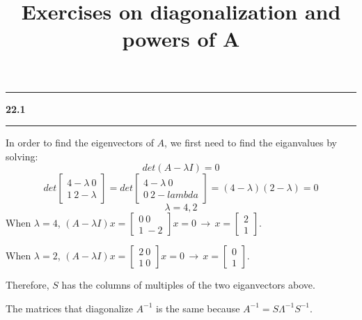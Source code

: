 \documentclass[11pt]{article}
\newcommand\question[2]{\vspace{.25in}\hrule\textbf{#1 #2}\vspace{.5em}\hrule\vspace{.10in}}
\begin{document}
\raggedright
\newcommand\NAME{Haiying Cui}  %
\newcommand\ANDREWID{Christy}     %
\newcommand\HWNUM{22}              %

\title{Exercises on diagonalization and powers of A}
\maketitle

\question{22.1}{}
In order to find the eigenvectors of \(A\), we first need to find the eiganvalues by solving:
$$det(A - \lambda I) = 0$$
$$det \begin{bmatrix} 4-\lambda \ 0 \\ 1 \ 2-\lambda \end{bmatrix} = det \begin{bmatrix} 4-\lambda \ 0 \\ 0 \ 2-lambda \end{bmatrix} = (4-\lambda)(2-\lambda) = 0$$
$$\lambda = 4, 2 $$
When \(\lambda = 4\), \((A-\lambda I)x = \begin{bmatrix} 0 \ 0 \\ 1 \ -2 \end{bmatrix} x = 0 \,\to\, x = \begin{bmatrix} 2 \\ 1\end{bmatrix}\).

When \(\lambda = 2\), \((A-\lambda I)x = \begin{bmatrix} 2 \ 0 \\ 1 \ 0 \end{bmatrix} x = 0 \,\to\, x = \begin{bmatrix} 0 \\ 1 \end{bmatrix}\).

Therefore, \(S\) has the columns of multiples of the two eiganvectors above.

The matrices that diagonalize \(A^{-1}\) is the same because \(A^{-1} = S\Lambda^{-1}S^{-1}\).
\end{document}
